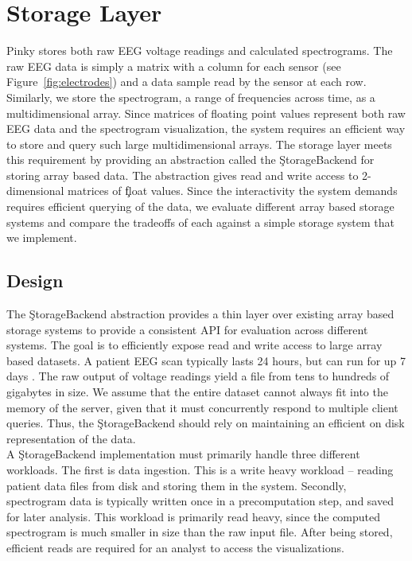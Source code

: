 \chapter{Storage Layer}\label{storage-ch}

Pinky stores both raw EEG voltage readings and calculated spectrograms. The raw
EEG data is simply a matrix with a column for each sensor (see
Figure~\ref{fig:electrodes}) and a data sample read by the sensor at each row.
Similarly, we store the spectrogram, a range of frequencies across time, as a
multidimensional array. Since matrices of floating point values represent both
raw EEG data and the spectrogram visualization, the system requires an
efficient way to store and query such large multidimensional arrays. The
storage layer meets this requirement by providing an abstraction called the
\c{StorageBackend} for storing array based data. The abstraction gives read and
write access to 2-dimensional matrices of \c{float} values. Since the
interactivity the system demands requires efficient querying of the data, we
evaluate different array based storage systems and compare the tradeoffs of
each against a simple storage system that we implement.

\section{Design}

The \c{StorageBackend} abstraction provides a thin layer over existing array
based storage systems to provide a consistent API for evaluation across
different systems. The goal is to efficiently expose read and write access to
large array based datasets. A patient EEG scan typically lasts 24 hours, but
can run for up 7 days \cite{ceeg-3}. The raw output of voltage readings yield a
file from tens to hundreds of gigabytes in size. We assume that the entire
dataset cannot always fit into the memory of the server, given that it must
concurrently respond to multiple client queries. Thus, the \c{StorageBackend}
should rely on maintaining an efficient on disk representation of the data. \\

A \c{StorageBackend} implementation must primarily handle three different
workloads. The first is data ingestion. This is a write heavy workload --
reading patient data files from disk and storing them in the system. Secondly,
spectrogram data is typically written once in a precomputation step, and saved
for later analysis. This workload is primarily read heavy, since the computed
spectrogram is much smaller in size than the raw input file.  After being
stored, efficient reads are required for an analyst to access the
visualizations.

